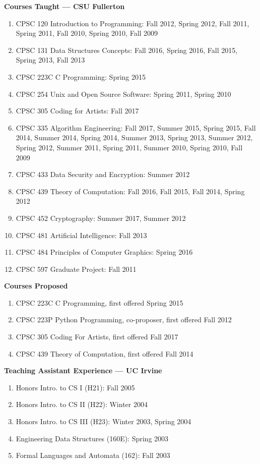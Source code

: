 \documentclass[11pt]{letter}
\begin{document}
\renewcommand{\labelenumi}{\arabic{enumi}.}


\textbf{Courses Taught --- CSU Fullerton}
\begin{enumerate}
\item CPSC 120 Introduction to Programming: Fall 2012,  Spring 2012, Fall 2011, Spring 2011, Fall 2010, Spring 2010, Fall 2009
\item CPSC 131 Data Structures Concepts: Fall 2016, Spring 2016, Fall 2015, Spring 2013, Fall 2013
\item CPSC 223C C Programming: Spring 2015
\item CPSC 254 Unix and Open Source Software: Spring 2011, Spring 2010
\item CPSC 305 Coding for Artists: Fall 2017
\item CPSC 335 Algorithm Engineering: Fall 2017, Summer 2015, Spring 2015, Fall 2014, Summer 2014, Spring 2014, Summer 2013, Spring 2013, Summer 2012, Spring 2012, Summer 2011, Spring 2011, Summer 2010, Spring 2010, Fall 2009
\item CPSC 433 Data Security and Encryption: Summer 2012
\item CPSC 439 Theory of Computation: Fall 2016, Fall 2015, Fall 2014, Spring 2012
\item CPSC 452 Cryptography: Summer 2017, Summer 2012
\item CPSC 481 Artificial Intelligence: Fall 2013
\item CPSC 484 Principles of Computer Graphics: Spring 2016
\item CPSC 597 Graduate Project: Fall 2011
\end{enumerate}

\textbf{Courses Proposed}
\begin{enumerate}
\item CPSC 223C C Programming, first offered Spring 2015
\item CPSC 223P Python Programming, co-proposer, first offered Fall 2012
\item CPSC 305 Coding For Artists, first offered Fall 2017
\item CPSC 439 Theory of Computation, first offered Fall 2014
\end{enumerate}

\textbf{Teaching Assistant Experience --- UC Irvine}
\begin{enumerate}
\item Honors Intro. to CS I (H21): Fall 2005
\item Honors Intro. to CS II (H22): Winter 2004
\item Honors Intro. to CS III (H23): Winter 2003, Spring 2004
\item Engineering Data Structures (160E): Spring 2003
\item Formal Languages and Automata (162): Fall 2003
\end{enumerate}
\end{document}
